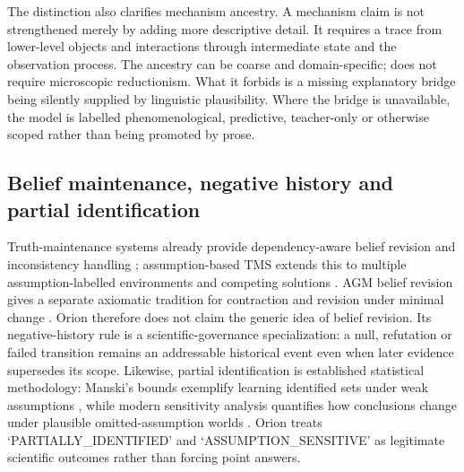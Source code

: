 The distinction also clarifies mechanism ancestry. A mechanism claim is not strengthened merely by adding more descriptive detail. It requires a trace from lower-level objects and interactions through intermediate state and the observation process. The ancestry can be coarse and domain-specific; \RAKL{} does not require microscopic reductionism. What it forbids is a missing explanatory bridge being silently supplied by linguistic plausibility. Where the bridge is unavailable, the model is labelled phenomenological, predictive, teacher-only or otherwise scoped rather than being promoted by prose.

\subsection{Belief maintenance, negative history and partial identification}
Truth-maintenance systems already provide dependency-aware belief revision and inconsistency handling \cite{doyle1979}; assumption-based TMS extends this to multiple assumption-labelled environments and competing solutions \cite{dekleer1986}. AGM belief revision gives a separate axiomatic tradition for contraction and revision under minimal change \cite{agm1985}. Orion therefore does not claim the generic idea of belief revision. Its negative-history rule is a scientific-governance specialization: a null, refutation or failed transition remains an addressable historical event even when later evidence supersedes its scope. Likewise, partial identification is established statistical methodology: Manski's bounds exemplify learning identified sets under weak assumptions \cite{manski1990}, while modern sensitivity analysis quantifies how conclusions change under plausible omitted-assumption worlds \cite{cinelli2020}. Orion treats `PARTIALLY\_IDENTIFIED' and `ASSUMPTION\_SENSITIVE' as legitimate scientific outcomes rather than forcing point answers.
